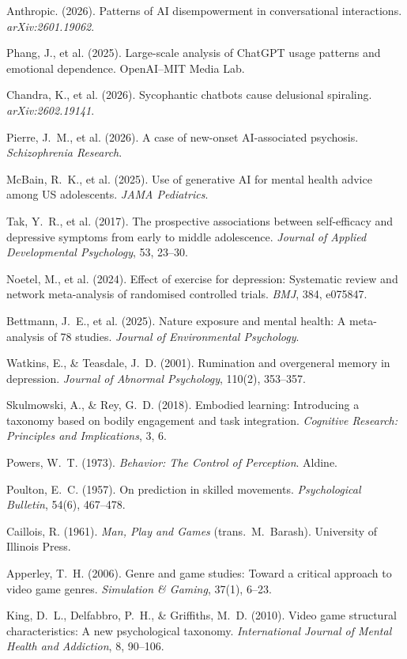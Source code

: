 \documentclass[a4paper,11pt,titlepage]{article}
\begin{document}
\begin{enumerate}[label={[\arabic*]}, leftmargin=2em, itemsep=2pt]
  \item Anthropic. (2026). Patterns of AI disempowerment in conversational interactions. \textit{arXiv:2601.19062}.
  \item Phang, J., et al. (2025). Large-scale analysis of ChatGPT usage patterns and emotional dependence. OpenAI--MIT Media Lab.
  \item Chandra, K., et al. (2026). Sycophantic chatbots cause delusional spiraling. \textit{arXiv:2602.19141}.
  \item Pierre, J.~M., et al. (2026). A case of new-onset AI-associated psychosis. \textit{Schizophrenia Research}.
  \item McBain, R.~K., et al. (2025). Use of generative AI for mental health advice among US adolescents. \textit{JAMA Pediatrics}.
  \item Tak, Y.~R., et al. (2017). The prospective associations between self-efficacy and depressive symptoms from early to middle adolescence. \textit{Journal of Applied Developmental Psychology}, 53, 23--30.
  \item Noetel, M., et al. (2024). Effect of exercise for depression: Systematic review and network meta-analysis of randomised controlled trials. \textit{BMJ}, 384, e075847.
  \item Bettmann, J.~E., et al. (2025). Nature exposure and mental health: A meta-analysis of 78 studies. \textit{Journal of Environmental Psychology}.
  \item Watkins, E., \& Teasdale, J.~D. (2001). Rumination and overgeneral memory in depression. \textit{Journal of Abnormal Psychology}, 110(2), 353--357.
  \item Skulmowski, A., \& Rey, G.~D. (2018). Embodied learning: Introducing a taxonomy based on bodily engagement and task integration. \textit{Cognitive Research: Principles and Implications}, 3, 6.
  \item Powers, W.~T. (1973). \textit{Behavior: The Control of Perception}. Aldine.
  \item Poulton, E.~C. (1957). On prediction in skilled movements. \textit{Psychological Bulletin}, 54(6), 467--478.
  \item Caillois, R. (1961). \textit{Man, Play and Games} (trans.\ M.\ Barash). University of Illinois Press.
  \item Apperley, T.~H. (2006). Genre and game studies: Toward a critical approach to video game genres. \textit{Simulation \& Gaming}, 37(1), 6--23.
  \item King, D.~L., Delfabbro, P.~H., \& Griffiths, M.~D. (2010). Video game structural characteristics: A new psychological taxonomy. \textit{International Journal of Mental Health and Addiction}, 8, 90--106.

\end{enumerate}
\end{document}
